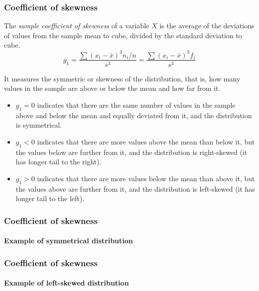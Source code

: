 \begin{frame}
\frametitle{Coefficient of skewness}
\begin{definition}
The \emph{sample coefficient of skewness} of a variable $X$ is the average of the deviations of values from the sample
mean to cube, divided by the standard deviation to cube. 
\[
g_1 = \frac{\sum (x_i-\bar x)^3 n_i/n}{s^3} = \frac{\sum (x_i-\bar x)^3 f_i}{s^3}
\]
\end{definition}

It measures the symmetric or skewness of the distribution, that is, how many values in the
sample are above or below the mean and how far from it. 
\begin{itemize}
\item $g_1=0$ indicates that there are the same number of values in the sample above and below the mean and
equally deviated from it, and the distribution is symmetrical.
\item $g_1<0$ indicates that there are more values above the mean than below it, but the values below are further from
it, and the distribution is right-skewed (it has longer tail to the right). 
\item $g_1>0$ indicates that there are more values below the mean than above it, but the values above are further from
it, and the distribution is left-skewed (it has longer tail to the left).  
\end{itemize}
\end{frame}


\begin{frame}
\frametitle{Coefficient of skewness}
\framesubtitle{Example of symmetrical distribution}
\begin{center}
\scalebox{0.6}{}
\end{center}
\end{frame} 


\begin{frame}
\frametitle{Coefficient of skewness}
\framesubtitle{Example of left-skewed distribution}
\begin{center}
\scalebox{0.6}{}
\end{center}
\end{frame} 


